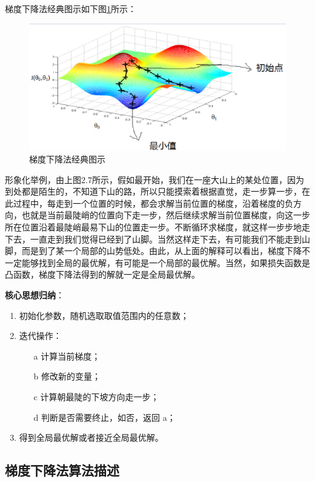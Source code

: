 梯度下降法经典图示如下图\ref{fig:2.7}所示：

 \begin{figure}[h]
   \centering
   \includegraphics[width=.7\textwidth]{imgs/2.25.1.eps}
   \caption{梯度下降法经典图示}
   \label{fig:2.7}
 \end{figure}

形象化举例，由上图2.7所示，假如最开始，我们在一座大山上的某处位置，因为到处都是陌生的，不知道下山的路，所以只能摸索着根据直觉，走一步算一步，在此过程中，每走到一个位置的时候，都会求解当前位置的梯度，沿着梯度的负方向，也就是当前最陡峭的位置向下走一步，然后继续求解当前位置梯度，向这一步所在位置沿着最陡峭最易下山的位置走一步。不断循环求梯度，就这样一步步地走下去，一直走到我们觉得已经到了山脚。当然这样走下去，有可能我们不能走到山脚，而是到了某一个局部的山势低处。由此，从上面的解释可以看出，梯度下降不一定能够找到全局的最优解，有可能是一个局部的最优解。当然，如果损失函数是凸函数，梯度下降法得到的解就一定是全局最优解。

{\bf 核心思想归纳}：

\begin{enumerate}
\itemsep0em 
\item 初始化参数，随机选取取值范围内的任意数；
\item 迭代操作：
	\begin{enumerate}
	\itemsep0em 
	\item[a] 计算当前梯度；
	\item[b] 修改新的变量；
	\item[c] 计算朝最陡的下坡方向走一步；
	\item[d] 判断是否需要终止，如否，返回 a；
	\end{enumerate}
\item 得到全局最优解或者接近全局最优解。
\end{enumerate}

\subsection{梯度下降法算法描述}

